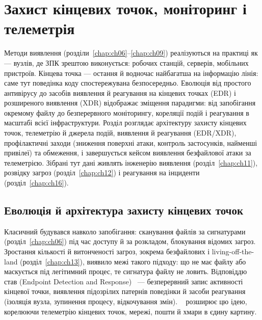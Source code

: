 \chapter{Захист кінцевих точок, моніторинг і телеметрія}
\label{chap:ch10}

Методи виявлення (розділи~\ref{chap:ch06}--\ref{chap:ch09}) реалізуються на практиці як  --- вузлів, де ЗПК зрештою виконується: робочих станцій, серверів, мобільних пристроїв. Кінцева точка --- остання й водночас найбагатша на інформацію лінія: саме тут поведінка коду спостережувана безпосередньо. Еволюція від простого антивірусу до засобів виявлення й реагування на кінцевих точках (EDR) і розширеного виявлення (XDR) відображає зміщення парадигми: від запобігання окремому файлу до безперервного моніторингу, кореляції подій і реагування в масштабі всієї інфраструктури. Розділ розглядає архітектуру захисту кінцевих точок, телеметрію й джерела подій, виявлення й реагування (EDR/XDR), профілактичні заходи (зниження поверхні атаки, контроль застосунків, найменші привілеї) та обмеження, і завершується кейсом виявлення безфайлової атаки за телеметрією. Зібрані тут дані живлять інженерію виявлення (розділ~\ref{chap:ch11}), розвідку загроз (розділ~\ref{chap:ch12}) і реагування на інциденти (розділ~\ref{chap:ch16}).

\section{Еволюція й архітектура захисту кінцевих точок}\label{sec:ch10-arch}

Класичний  будувався навколо запобігання: сканування файлів за сигнатурами (розділ~\ref{chap:ch06}) під час доступу й за розкладом, блокування відомих загроз. Зростання кількості й витонченості загроз, зокрема безфайлових і living-off-the-land (розділ~\ref{chap:ch13}), виявило межі такого підходу: що не має файлу або маскується під легітимний процес, те сигнатура файлу не ловить. Відповіддю став  (Endpoint Detection and Response)~\cite{ch10:gartner-edr} --- безперервний запис активності кінцевої точки, виявлення підозрілих патернів поведінки й засоби реагування (ізоляція вузла, зупинення процесу, відкочування змін). ~\cite{ch10:xdr} розширює цю ідею, корелюючи телеметрію кінцевих точок, мережі, пошти й хмари в єдину картину.

